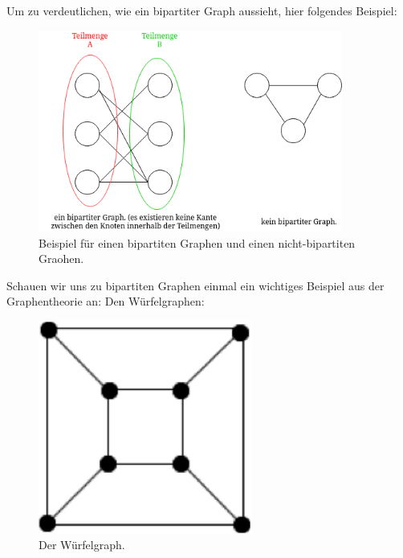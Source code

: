 \documentclass{article}
\theoremstyle{plain}
\begin{document}
\newpage
Um zu verdeutlichen, wie ein bipartiter Graph aussieht, hier folgendes Beispiel:
\begin{figure}[!htp]
    \centering
    \includegraphics[width=10cm]{vortrag_schriftlich/images/bipartit.drawio.png}
    \caption{Beispiel für einen bipartiten Graphen und einen nicht-bipartiten Graohen.}
    \label{fig:fig4}
\end{figure}
\clearpage
Schauen wir uns zu bipartiten Graphen einmal ein wichtiges Beispiel aus der Graphentheorie an: Den Würfelgraphen:\\
\begin{figure}[!htp]
    \centering
    \includegraphics[width=7cm]{vortrag_schriftlich/images/wuerfelgraph.png}
    \caption{Der Würfelgraph.}
    \label{fig:fig5}
\end{figure}\cite{website:wikiversity}
\newpage
\end{document}
